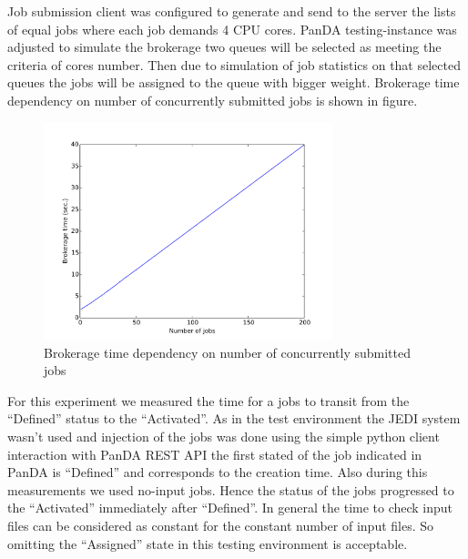 Job submission client was configured to generate and send to the server the
lists of equal jobs where each job demands 4 CPU cores. PanDA testing-instance
was adjusted to simulate the brokerage two queues will be selected as meeting
the criteria of cores number. Then due to simulation of job statistics on that
selected queues the jobs will be assigned to the queue with bigger weight.
Brokerage time dependency on number of concurrently submitted jobs is shown in
figure.

\begin{figure}
  \includegraphics[width=0.75\textwidth]{images/Fig2.png}
\caption{Brokerage time dependency on number of concurrently submitted jobs}
\label{fig:brokeragescaling}
\end{figure}

For this experiment we measured the time for a jobs to transit from the
``Defined'' status to the ``Activated''. As in the test environment the JEDI
system wasn't used and injection of the jobs was done using the simple python
client interaction with PanDA REST API the first stated of the job indicated in
PanDA is ``Defined'' and corresponds to the creation time. Also during this
measurements we used no-input jobs. Hence the status of the jobs progressed to
the ``Activated'' immediately after ``Defined''. In general the time to check
input files can be considered as constant for the constant number of input
files. So omitting the ``Assigned'' state in this testing environment is
acceptable. 



